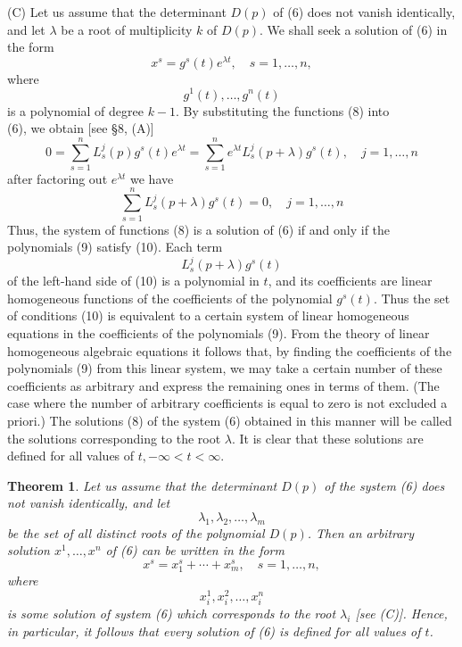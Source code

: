 \documentclass[10pt,a5paper]{book}
\theoremstyle{plain}
\newtheorem{theorem}{Theorem}
\theoremstyle{definition}
\theoremstyle{remark}
\begin{document}
(C) Let us assume that the determinant $D(p)$ of (6) does not vanish identically, and let $\lambda$ be a root of multiplicity $k$ of $D(p)$. We shall seek a solution of (6) in the form
\begin{equation*}
x^{s}=g^{s}(t) e^{\lambda t}, \quad s=1, \ldots, n, \tag{8}
\end{equation*}
where
\begin{equation*}
g^{1}(t), \ldots, g^{n}(t) \tag{9}
\end{equation*}
is a polynomial of degree $k-1$. By substituting the functions (8) into\\[0pt]
(6), we obtain [see §8, (A)]
\[
0=\sum_{s=1}^{n} L_{s}^{j}(p) g^{s}(t) e^{\lambda t}=\sum_{s=1}^{n} e^{\lambda t} L_{s}^{j}(p+\lambda) g^{s}(t), \quad j=1, \ldots, n
\]
after factoring out $e^{\lambda t}$ we have
\begin{equation*}
\sum_{s=1}^{n} L_{s}^{j}(p+\lambda) g^{s}(t)=0, \quad j=1, \ldots, n \tag{10}
\end{equation*}
Thus, the system of functions (8) is a solution of (6) if and only if the polynomials (9) satisfy (10). Each term
\[
L_{s}^{j}(p+\lambda) g^{s}(t)
\]
of the left-hand side of (10) is a polynomial in $t$, and its coefficients are linear homogeneous functions of the coefficients of the polynomial $g^{s}(t)$. Thus the set of conditions (10) is equivalent to a certain system of linear homogeneous equations in the coefficients of the polynomials (9). From the theory of linear homogeneous algebraic equations it follows that, by finding the coefficients of the polynomials (9) from this linear system, we may take a certain number of these coefficients as arbitrary and express the remaining ones in terms of them. (The case where the number of arbitrary coefficients is equal to zero is not excluded a priori.) The solutions (8) of the system (6) obtained in this manner will be called the solutions corresponding to the root $\lambda$. It is clear that these solutions are defined for all values of $t,-\infty<t<\infty$.

\begin{theorem}
Let us assume that the determinant $D(p)$ of the system (6) does not vanish identically, and let
\[
\lambda_{1}, \lambda_{2}, \ldots, \lambda_{m}
\]
be the set of all distinct roots of the polynomial $D(p)$. Then an arbitrary solution $x^{1}, \ldots, x^{n}$ of (6) can be written in the form
\begin{equation*}
x^{s}=x_{1}^{s}+\cdots+x_{m}^{s}, \quad s=1, \ldots, n, \tag{11}
\end{equation*}
where
\[
x_{i}^{1}, x_{i}^{2}, \ldots, x_{i}^{n}
\]
is some solution of system (6) which corresponds to the root $\lambda_{i}$ [see (C)]. Hence, in particular, it follows that every solution of (6) is defined for all values of $t$.
\end{theorem}
\end{document}
